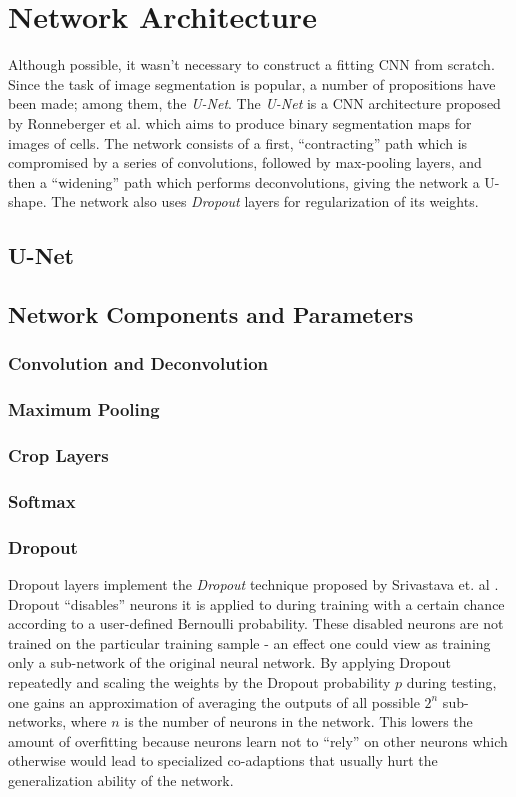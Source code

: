 \chapter {Network Architecture}
Although possible, it wasn't necessary to construct a fitting CNN from scratch. Since the task of image segmentation is popular, a number of propositions have been made; among them, the \textit{U-Net}. The \textit{U-Net} is a CNN architecture proposed by Ronneberger et al.\cite{unet} which aims to produce binary segmentation maps for images of cells. The network consists of a first, ``contracting'' path which is compromised by a series of convolutions, followed by max-pooling layers, and then a ``widening'' path which performs deconvolutions, giving the network a U-shape. The network also uses \textit{Dropout} layers\cite{dropout} for regularization of its weights.

	\section {U-Net}

	\section {Network Components and Parameters}
	
		\subsection{Convolution and Deconvolution}
		\subsection{Maximum Pooling}
		\subsection {Crop Layers}
		\subsection{Softmax}

		\subsection {Dropout}
Dropout layers implement the \textit{Dropout} technique proposed by Srivastava et. al \cite{dropout}. Dropout ``disables'' neurons it is applied to during training with a certain chance according to a user-defined Bernoulli probability. These disabled neurons are not trained on the particular training sample - an effect one could view as training only a sub-network of the original neural network. By applying Dropout repeatedly and scaling the weights by the Dropout probability $p$ during testing, one gains an approximation of averaging the outputs of all possible $2^n$ sub-networks, where $n$ is the number of neurons in the network. This lowers the amount of overfitting because neurons learn not to ``rely'' on other neurons which otherwise would lead to specialized co-adaptions that usually hurt the generalization ability of the network.

